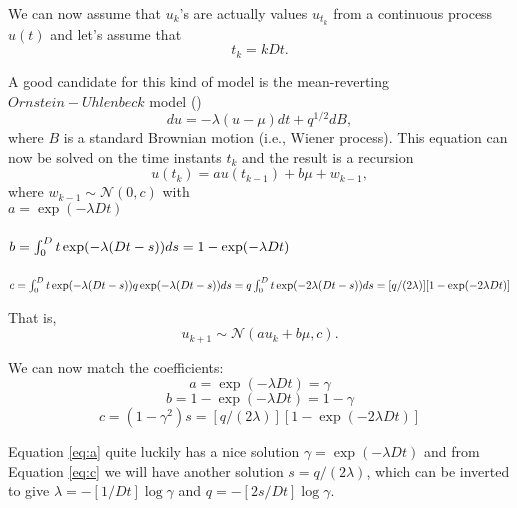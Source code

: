 We can now assume that $u_k$'s are actually values $u_{t_k}$ from a continuous process $u(t)$ and let's assume that 
\begin{equation}
t_k = kDt.
\end{equation}

A good candidate for this kind of model is the mean-reverting $Ornstein-Uhlenbeck$ model 
(\cite{Ornstein_Uhlenbeck:1930})
\begin{equation}
du = -\lambda \left(u - \mu\right) dt + q^{1/2} dB,
\end{equation}
where $B$ is a standard Brownian motion (i.e., Wiener process). This equation can now be solved on the time instants $t_k$ and the result is a recursion
\begin{equation}
u(t_k) = a u(t_{k-1}) + b \mu + w_{k-1},
\end{equation}
where $w_{k-1} \sim \mathcal{N}(0,c)$ with\\
$a = \exp(-\lambda Dt)$\\~\\
$b = \int_0^Dt \exp(-\lambda (Dt-s)) ds\\
 = 1 - \exp(-\lambda Dt)$\\~\\
$c = \int_0^Dt \exp(-\lambda (Dt-s)) q \exp(-\lambda (Dt-s)) ds \\
= q \int_0^Dt \exp(-2 \lambda (Dt-s)) ds\\
= [q / (2 \lambda)] [1 - \exp(-2 \lambda Dt)]$

That is,
\begin{equation}
u_{k+1} \sim \mathcal{N}\left(a u_k + b \mu, c\right).
\end{equation}

We can now match the coefficients:
\begin{equation} \label{eq:a}
a = \exp(-\lambda Dt) = \gamma
\end{equation}
\begin{equation} \label{eq:b}
b = 1 - \exp(-\lambda Dt) = 1 - \gamma
\end{equation}
\begin{equation} \label{eq:c}
c = (1 - \gamma^2) s = [q / (2 \lambda)] [1 - \exp(-2 \lambda Dt)]
\end{equation}

Equation \ref{eq:a} quite luckily has a nice solution 
$\gamma = \exp(-\lambda Dt)$ and from Equation \ref{eq:c} we will have another solution
$s = q / (2 \lambda)$,
which can be inverted to give
$\lambda = -[1 / Dt] \log \gamma$ and
$q = -[2 s / Dt] \log \gamma$. 

